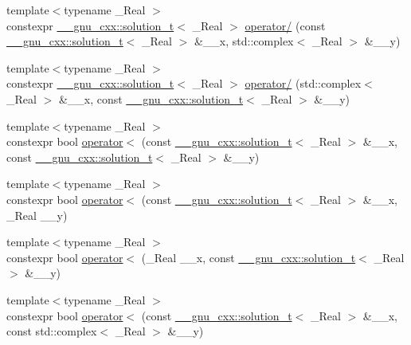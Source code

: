 \begin{DoxyCompactItemize}
\item 
{\footnotesize template$<$typename \+\_\+\+Real $>$ }\\constexpr \hyperlink{namespace____gnu__cxx_ae20ea642de50eb361074c62676b0159c}{\+\_\+\+\_\+gnu\+\_\+cxx\+::solution\+\_\+t}$<$ \+\_\+\+Real $>$ \hyperlink{namespacestd_a59403102f8805c3846c7fbf820e7b48a}{operator/} (const \hyperlink{namespace____gnu__cxx_ae20ea642de50eb361074c62676b0159c}{\+\_\+\+\_\+gnu\+\_\+cxx\+::solution\+\_\+t}$<$ \+\_\+\+Real $>$ \&\+\_\+\+\_\+x, std\+::complex$<$ \+\_\+\+Real $>$ \&\+\_\+\+\_\+y)
\item 
{\footnotesize template$<$typename \+\_\+\+Real $>$ }\\constexpr \hyperlink{namespace____gnu__cxx_ae20ea642de50eb361074c62676b0159c}{\+\_\+\+\_\+gnu\+\_\+cxx\+::solution\+\_\+t}$<$ \+\_\+\+Real $>$ \hyperlink{namespacestd_a51cf4f07903a8d424249d8198c73843d}{operator/} (std\+::complex$<$ \+\_\+\+Real $>$ \&\+\_\+\+\_\+x, const \hyperlink{namespace____gnu__cxx_ae20ea642de50eb361074c62676b0159c}{\+\_\+\+\_\+gnu\+\_\+cxx\+::solution\+\_\+t}$<$ \+\_\+\+Real $>$ \&\+\_\+\+\_\+y)
\item 
{\footnotesize template$<$typename \+\_\+\+Real $>$ }\\constexpr bool \hyperlink{namespacestd_a85cfd5c1970e0d79e11521e9af3b4011}{operator$<$} (const \hyperlink{namespace____gnu__cxx_ae20ea642de50eb361074c62676b0159c}{\+\_\+\+\_\+gnu\+\_\+cxx\+::solution\+\_\+t}$<$ \+\_\+\+Real $>$ \&\+\_\+\+\_\+x, const \hyperlink{namespace____gnu__cxx_ae20ea642de50eb361074c62676b0159c}{\+\_\+\+\_\+gnu\+\_\+cxx\+::solution\+\_\+t}$<$ \+\_\+\+Real $>$ \&\+\_\+\+\_\+y)
\item 
{\footnotesize template$<$typename \+\_\+\+Real $>$ }\\constexpr bool \hyperlink{namespacestd_a749f896a40896157206f192de6dea285}{operator$<$} (const \hyperlink{namespace____gnu__cxx_ae20ea642de50eb361074c62676b0159c}{\+\_\+\+\_\+gnu\+\_\+cxx\+::solution\+\_\+t}$<$ \+\_\+\+Real $>$ \&\+\_\+\+\_\+x, \+\_\+\+Real \+\_\+\+\_\+y)
\item 
{\footnotesize template$<$typename \+\_\+\+Real $>$ }\\constexpr bool \hyperlink{namespacestd_a183c95d9119b28c67d257989db658fdb}{operator$<$} (\+\_\+\+Real \+\_\+\+\_\+x, const \hyperlink{namespace____gnu__cxx_ae20ea642de50eb361074c62676b0159c}{\+\_\+\+\_\+gnu\+\_\+cxx\+::solution\+\_\+t}$<$ \+\_\+\+Real $>$ \&\+\_\+\+\_\+y)
\item 
{\footnotesize template$<$typename \+\_\+\+Real $>$ }\\constexpr bool \hyperlink{namespacestd_a4586465c3d71c8a977bb56c06c604eab}{operator$<$} (const \hyperlink{namespace____gnu__cxx_ae20ea642de50eb361074c62676b0159c}{\+\_\+\+\_\+gnu\+\_\+cxx\+::solution\+\_\+t}$<$ \+\_\+\+Real $>$ \&\+\_\+\+\_\+x, const std\+::complex$<$ \+\_\+\+Real $>$ \&\+\_\+\+\_\+y)

\end{DoxyCompactItemize}
